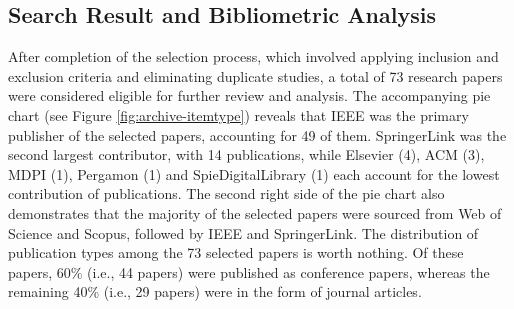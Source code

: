 \subsection{Search Result and Bibliometric Analysis}

After completion of the selection process, which involved applying inclusion and exclusion criteria and eliminating duplicate studies, a total of 73 research papers were considered eligible for further review and analysis. The accompanying pie chart (see Figure \ref{fig:archive-itemtype}) reveals that IEEE was the primary publisher of the selected papers, accounting for 49 of them. SpringerLink was the second largest contributor, with 14 publications, while Elsevier (4), ACM (3), MDPI (1), Pergamon (1) and SpieDigitalLibrary (1) each account for the lowest contribution of publications. The second right side of the pie chart also demonstrates that the majority of the selected papers were sourced from Web of Science and Scopus, followed by IEEE and SpringerLink. The distribution of publication types among the 73 selected papers is worth nothing. Of these papers, 60\% (i.e., 44 papers) were published as conference papers, whereas the remaining 40\% (i.e., 29 papers) were in the form of journal articles.



% 
% 

